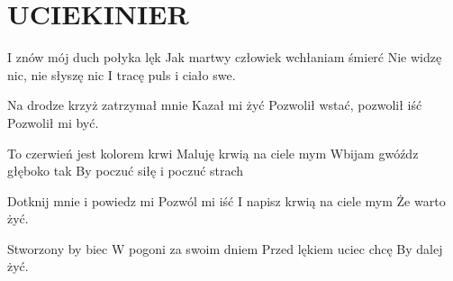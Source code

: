 \documentclass[../../../songbook.tex]{subfiles}
\begin{document}
\TabPositions{8cm} %
\section*{UCIEKINIER}
{}
\vspace{0.5cm}
I znów mój duch połyka lęk \newline
Jak martwy człowiek wchłaniam śmierć \newline
Nie widzę nic, nie słyszę nic \newline
I tracę puls i ciało swe. \newline

Na drodze krzyż zatrzymał mnie  \newline
Kazał mi żyć \newline
Pozwolił wstać, pozwolił iść \newline
Pozwolił mi być. \newline

To czerwień jest kolorem krwi\newline
Maluję krwią na ciele mym\newline
Wbijam gwóźdz głęboko tak\newline
By poczuć siłę i poczuć strach\newline

Dotknij mnie i powiedz mi\newline
Pozwól mi iść  \newline
I napisz krwią na ciele mym\newline
Że warto żyć.\newline

\-\hspace{1cm} Stworzony by biec  \newline
\-\hspace{1cm} W pogoni za swoim dniem  \newline
\-\hspace{1cm} Przed lękiem uciec chcę  \newline
\-\hspace{1cm} By dalej żyć.  \newline
\end{document}
